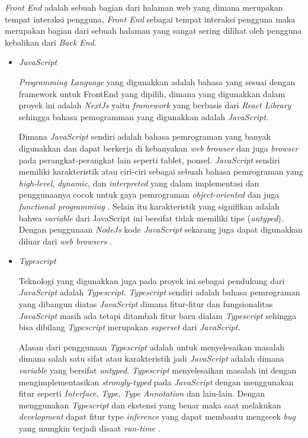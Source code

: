 \documentclass[a4paper]{article}
\begin{document}
\begin{enumerate}[label=\alph*. ]
\begin{enumerate}
                    \textit{Front End} adalah sebuah bagian dari halaman web yang dimana merupakan tempat interaksi pengguna, \textit{Front End} sebagai tempat interaksi pengguna maka merupakan bagian dari sebuah halaman yang sangat sering dilihat oleh pengguna kebalikan dari \textit{Back End}\autocite{codecademy-frontend}.

                    \begin{itemize}
                        \item \textit{JavaScript}

                        \textit{Programming Language} yang digunakkan adalah bahasa yang sesuai dengan framework untuk FrontEnd yang dipilih, dimana yang digunakkan dalam proyek ini adalah \textit{NextJs} yaitu \textit{framework} yang berbasis dari \textit{React Library} sehingga bahasa pemogramman yang digunakkan adalah \textit{JavaScript}.

                        Dimana \textit{JavaScript} sendiri adalah bahasa pemrograman yang banyak digunakkan dan dapat berkerja di kebanyakan \textit{web browser} dan juga \textit{browser} pada perangkat-perangkat lain seperti tablet, ponsel. \textit{JavaScript} sendiri memiliki karakteristik atau ciri-ciri sebagai sebuah bahasa pemrograman yang \textit{high-level}, \textit{dynamic}, dan \textit{interpreted} yang dalam implementasi dan penggunaanya cocok untuk gaya pemrograman \textit{object-oriented} dan juga \textit{functional programming} . Selain itu karakteristik yang signifikan adalah bahwa \textit{variable} dari JavaScript ini bersifat tidak memiliki tipe (\textit{untyped}). Dengan penggunaan \textit{NodeJs} kode \textit{JavaScript} sekarang juga dapat digunakkan diluar dari \textit{web browsers} \autocite{Js_book_Flanagan_2020}.

                        \item \textit{Typescript}

                        Teknologi yang digunakkan juga pada proyek ini sebagai pendukung dari \textit{JavaScript} adalah \textit{Typescript}. \textit{Typescript} sendiri adalah bahasa pemrograman yang dibangun diatas \textit{JavaScript} dimana fitur-fitur dan fungsionalitas \textit{JavaScript} masih ada tetapi ditambah fitur baru dialam \textit{Typescript} sehingga bisa dibilang \textit{Typescript} merupakan \textit{superset} dari \textit{JavaScript}.

                        Alasan dari penggunaan \textit{Typescript} adalah untuk menyelesaikan masalah dimana salah satu sifat atau karakteristik jadi \textit{JavaScript} adalah dimana \textit{variable} yang bersifat \textit{untyped}. \textit{Typescript} menyelesaikan masalah ini dengan mengimplementasikan \textit{strongly-typed} pada \textit{JavaScript} dengan menggunakan fitur seperti \textit{Interface}, \textit{Type}, \textit{Type Annotation} dan lain-lain. Dengan menggunakan \textit{Typescript} dan ekstensi yang benar maka saat melakukan \textit{development} dapat fitur type \textit{inference} yang dapat membantu mengecek \textit{bug} yang mungkin terjadi disaat \textit{run-time} \autocite{TypeScript_official}.


\end{itemize}
\end{enumerate}
\end{enumerate}
\end{document}
